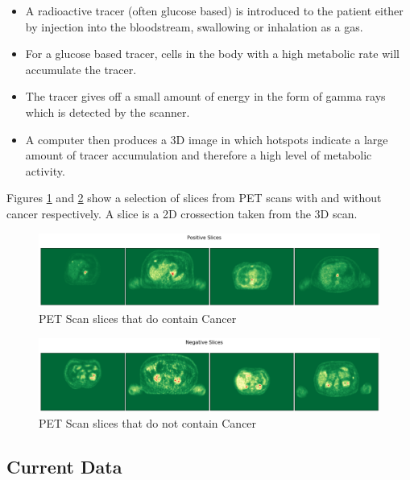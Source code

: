 \begin{itemize}
    \item A radioactive tracer (often glucose based) is introduced to the patient either by injection into the bloodstream, swallowing or inhalation as a gas.
    \item For a glucose based tracer, cells in the body with a high metabolic rate will accumulate the tracer.
    \item The tracer gives off a small amount of energy in the form of gamma rays which is detected by the scanner.
    \item A computer then produces a 3D image in which hotspots indicate a large amount of tracer accumulation and therefore a high level of metabolic activity.
\end{itemize}

Figures \ref{fig:positive} and \ref{fig:negative} show a selection of slices from PET scans with and without cancer respectively.
A slice is a 2D crossection taken from the 3D scan.

\begin{figure}[hbtp!]
    \centering
    \includegraphics[width=\textwidth]{./img/positive.png}
    \caption{PET Scan slices that do contain Cancer}
    \label{fig:positive}
\end{figure}

\begin{figure}[hbtp!]
    \centering
    \includegraphics[width=\textwidth]{./img/negative.png}
    \caption{PET Scan slices that do not contain Cancer}
    \label{fig:negative}
\end{figure}


\subsection{Current Data}\label{subsec:current_data_intro}

